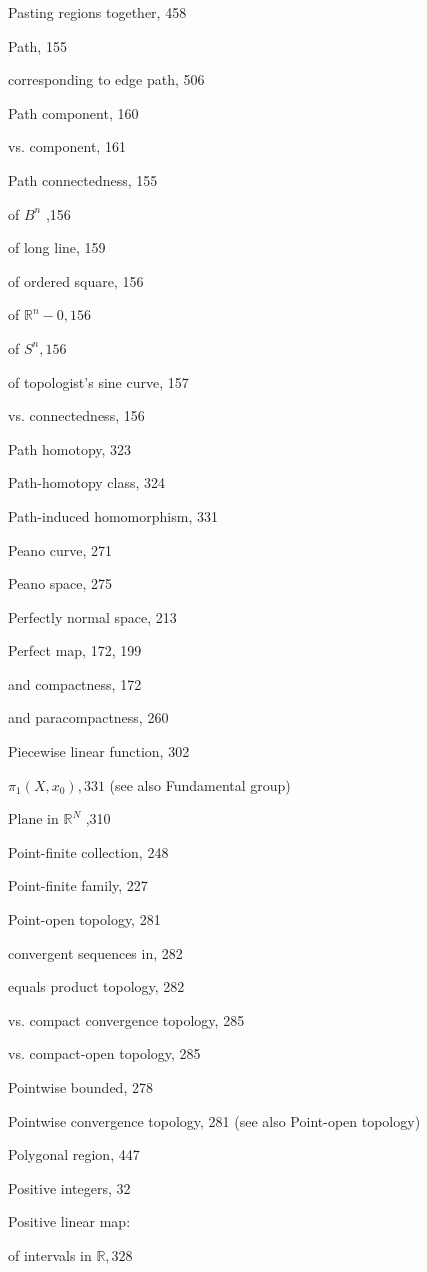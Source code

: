 Pasting regions together, 458

Path, 155

corresponding to edge path, 506

Path component, 160

vs. component, 161

Path connectedness, 155

of \({B}^{n}\) ,156

of long line, 159

of ordered square, 156

of \({\mathbb{R}}^{n} - 0,{156}\)

of \({S}^{n},{156}\)

of topologist's sine curve, 157

vs. connectedness, 156

Path homotopy, 323

Path-homotopy class, 324

Path-induced homomorphism, 331

Peano curve, 271

Peano space, 275

Perfectly normal space, 213

Perfect map, 172, 199

and compactness, 172

and paracompactness, 260

Piecewise linear function, 302

\({\pi }_{1}\left( {X,{x}_{0}}\right) ,{331}\) (see also Fundamental group)

Plane in \({\mathbb{R}}^{N}\) ,310

Point-finite collection, 248

Point-finite family, 227

Point-open topology, 281

convergent sequences in, 282

equals product topology, 282

vs. compact convergence topology, 285

vs. compact-open topology, 285

Pointwise bounded, 278

Pointwise convergence topology, 281 (see also Point-open topology)

Polygonal region, 447

Positive integers, 32

Positive linear map:

of intervals in \(\mathbb{R},{328}\)

